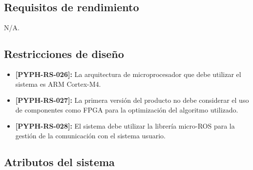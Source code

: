 \documentclass[12pt,a4paper, twosite]{article}
\begin{document}
\subsection{Requisitos de rendimiento}
\label{sec:org94bc543}

N/A.


\subsection{Restricciones de diseño}
\label{sec:org49fe900}



\begin{itemize}
  \item \textbf{[PYPH-RS-026]:} La arquitectura de microprocesador que debe utilizar el sistema
  es ARM Cortex-M4.
  \item \textbf{[PYPH-RS-027]:} La primera versión del producto no debe considerar el uso de
  componentes como FPGA para la optimización del algoritmo utilizado.
  \item \textbf{[PYPH-RS-028]:} El sistema debe utilizar la librería micro-ROS para la gestión
  de la comunicación con el sistema usuario.
\end{itemize}

\subsection{Atributos del sistema}
\label{sec:orgd0babc0}

\end{document}
